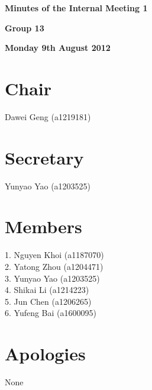 \documentclass[11pt, a4paper]{article}
\begin{document}
 



\vspace*{15pt}

\begin{center}
\huge \bf Minutes of the Internal Meeting 1
\end{center}


\begin{center}
\Large \bf Group 13
\end{center}

\begin{center}
\Large \bf Monday 9th August 2012
\end{center}

\section*{Chair}
 Dawei Geng (a1219181)

\section*{Secretary}
Yunyao Yao (a1203525)

\section*{Members}
1. Nguyen Khoi (a1187070)\\
2. Yatong Zhou (a1204471)\\
3. Yunyao Yao (a1203525)\\
4. Shikai Li (a1214223)\\
5. Jun Chen (a1206265)\\
6. Yufeng Bai (a1600095)
\vspace*{10pt}

\section*{Apologies}
None
\end{document}
